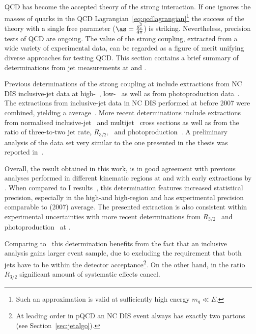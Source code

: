 QCD has become the accepted theory of the strong interaction. If one ignores the masses of quarks in the QCD Lagrangian~\eqref{eq:qcdlagrangian}\footnote{Such an approximation is valid at sufficiently high energy $m_q \ll E$.} the success of the theory with a single free parameter ($\as=\frac{g^2_s}{4\pi}$) is striking. Nevertheless, precision tests of QCD are ongoing. The value of the strong coupling, extracted from a wide variety of experimental data, can be regarded as a figure of merit unifying diverse approaches for testing QCD. This section contains a brief summary of \as determinations from jet measurements at \hera and \lhc.

Previous determinations of the strong coupling at \hera include extractions from NC DIS inclusive-jet data at high-\qsq~\cite{pl:b649:12,Aktas:2007aa}, low-\qsq~\cite{Aaron:2010ac} as well as from photoproduction data~\cite{pl:b560:7}. The extractions from inclusive-jet data in NC DIS performed at \hera before 2007 were combined, yielding a \hera average~\cite{upub:zp07125:hp07132}. More recent determinations include extractions from normalised inclusive-jet~\cite{epj:c65:363} and multijet~\cite{epj:c75:65} cross sections as well as from the ratio of three-to-two jet rate, $R_{3/2}$,~\cite{thesis:behr:2010} and photoproduction~\cite{np:b864:1}. A preliminary analysis of the data set very similar to the one presented in the thesis was reported in~\cite{upub:zp10002}.

Overall, the result obtained in this work, is in good agreement with previous analyses performed in different kinematic regions at \zeus and with early extractions by \hone. When compared to \hera I results~\cite{pl:b649:12,Aktas:2007aa,pl:b560:7}, this determination features increased statistical precision, especially in the high-\etjetb and high-\qsq region and has experimental precision comparable to \hera (2007) average. The presented extraction is also consistent within experimental uncertainties with more recent determinations from $R_{3/2}$~\cite{thesis:behr:2010} and photoproduction~\cite{np:b864:1} at \zeus. 

Comparing to~\cite{thesis:behr:2010} this determination benefits from the fact that an inclusive analysis gains larger event sample, due to excluding the requirement that both jets have to be within the detector acceptance\footnote{At leading order in pQCD an NC DIS event always has exactly two partons (see Section~\ref{sec:jetalgo}).}. On the other hand, in the ratio $R_{3/2}$ significant amount of systematic effects cancel. 

